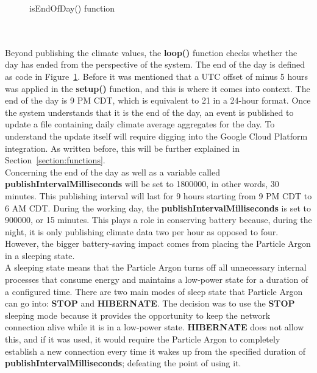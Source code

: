 \documentclass{article}
\begin{document}
\begin{minipage}[c]{\textwidth}
	\begin{figure}[H]
		
		\caption{isEndOfDay() function}
		\label{fig:endofday}
	\end{figure}
\end{minipage}\ \\\\

Beyond publishing the climate values, the \textbf{loop()} function checks whether the day has ended from the perspective of the system. The end of the day is defined as code in Figure~\ref{fig:endofday}. Before it was mentioned that a UTC offset of minus 5 hours was applied in the \textbf{setup()} function, and this is where it comes into context. The end of the day is 9 PM CDT, which is equivalent to 21 in a 24-hour format. Once the system understands that it is the end of the day, an event is published to update a file containing daily climate average aggregates for the day. To understand the update itself will require digging into the Google Cloud Platform integration. As written before, this will be further explained in Section~\ref{section:functions}.\\

Concerning the end of the day as well as a variable called \textbf{publishIntervalMilliseconds} will be set to 1800000, in other words, 30 minutes. This publishing interval will last for 9 hours starting from 9 PM CDT to 6 AM CDT. During the working day, the \textbf{publishIntervalMilliseconds} is set to 900000, or 15 minutes. This plays a role in conserving battery because, during the night, it is only publishing climate data two per hour as opposed to four. However, the bigger battery-saving impact comes from placing the Particle Argon in a sleeping state.\\

A sleeping state means that the Particle Argon turns off all unnecessary internal processes that consume energy and maintains a low-power state for a duration of a configured time. There are two main modes of sleep state that Particle Argon can go into: \textbf{STOP} and \textbf{HIBERNATE}. The decision was to use the \textbf{STOP} sleeping mode because it provides the opportunity to keep the network connection alive while it is in a low-power state. \textbf{HIBERNATE} does not allow this, and if it was used, it would require the Particle Argon to completely establish a new connection every time it wakes up from the specified duration of \textbf{publishIntervalMilliseconds}; defeating the point of using it.
\end{document}
